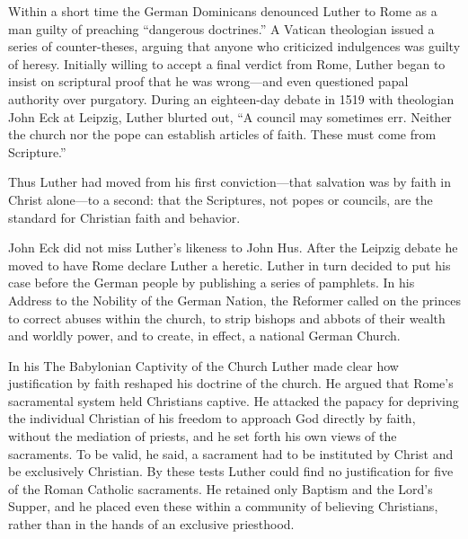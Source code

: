 Within a short time the German Dominicans denounced Luther to Rome as a man guilty of preaching
“dangerous doctrines.” A Vatican theologian issued a series of counter-theses, arguing that anyone
who criticized indulgences was guilty of heresy. Initially willing to accept a final verdict from
Rome, Luther began to insist on scriptural proof that he was wrong—and even questioned papal
authority over purgatory. During an eighteen-day debate in 1519 with theologian John Eck at Leipzig,
Luther blurted out, “A council may sometimes err. Neither the church nor the pope can establish
articles of faith. These must come from Scripture.”

Thus Luther had moved from his first conviction—that salvation was by faith in Christ alone—to a
second: that the Scriptures, not popes or councils, are the standard for Christian faith and
behavior.

John Eck did not miss Luther’s likeness to John Hus. After the Leipzig debate he moved to have Rome
declare Luther a heretic. Luther in turn decided to put his case before the German people by
publishing a series of pamphlets. In his Address to the Nobility of the German Nation, the Reformer
called on the princes to correct abuses within the church, to strip bishops and abbots of their
wealth and worldly power, and to create, in effect, a national German Church.

In his The Babylonian Captivity of the Church Luther made clear how justification by faith reshaped
his doctrine of the church. He argued that Rome’s sacramental system held Christians captive. He
attacked the papacy for depriving the individual Christian of his freedom to approach God directly
by faith, without the mediation of priests, and he set forth his own views of the sacraments. To be
valid, he said, a sacrament had to be instituted by Christ and be exclusively Christian. By these
tests Luther could find no justification for five of the Roman Catholic sacraments. He retained only
Baptism and the Lord’s Supper, and he placed even these within a community of believing Christians,
rather than in the hands of an exclusive priesthood.

